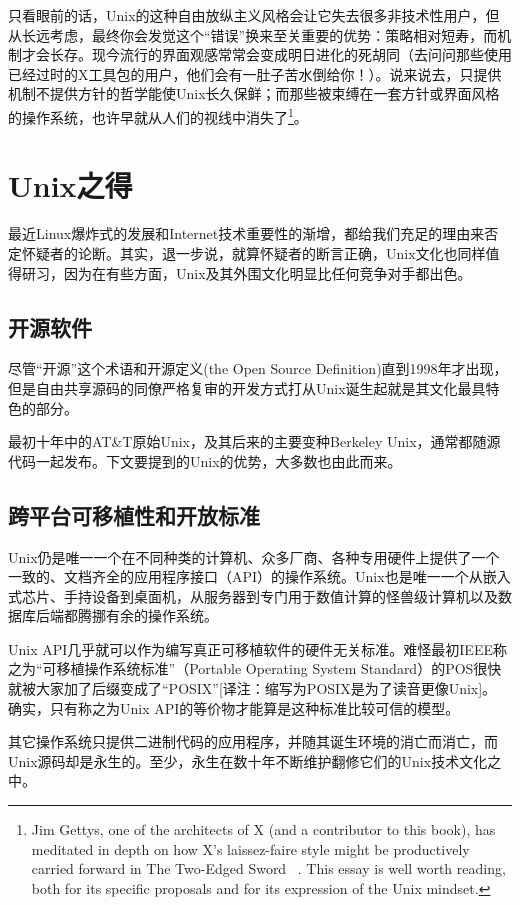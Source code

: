 \documentclass[12pt,oneside]{ctexbook}
\begin{document}
\begin{common-format}
只看眼前的话，Unix的这种自由放纵主义风格会让它失去很多非技术性用户，但从长远考虑，最终你会发觉这个“错误”换来至关重要的优势：策略相对短寿，而机制才会长存。现今流行的界面观感常常会变成明日进化的死胡同（去问问那些使用已经过时的X工具包的用户，他们会有一肚子苦水倒给你！）。说来说去，只提供机制不提供方针的哲学能使Unix长久保鲜；而那些被束缚在一套方针或界面风格的操作系统，也许早就从人们的视线中消失了\footnote{Jim Gettys, one of the architects of X (and a contributor to this book), has meditated in depth on how X's laissez-faire style might be productively carried forward in The Two-Edged Sword ~\cite{Gettys}. This essay is well worth reading, both for its specific proposals and for its expression of the Unix mindset.}。


\section{Unix之得}
最近Linux爆炸式的发展和Internet技术重要性的渐增，都给我们充足的理由来否定怀疑者的论断。其实，退一步说，就算怀疑者的断言正确，Unix文化也同样值得研习，因为在有些方面，Unix及其外围文化明显比任何竞争对手都出色。

\subsection{开源软件}
尽管“开源”这个术语和开源定义(the Open Source Definition)直到1998年才出现，但是自由共享源码的同僚严格复审的开发方式打从Unix诞生起就是其文化最具特色的部分。

最初十年中的AT\&{}T原始Unix，及其后来的主要变种Berkeley Unix，通常都随源代码一起发布。下文要提到的Unix的优势，大多数也由此而来。

\subsection{跨平台可移植性和开放标准}
Unix仍是唯一一个在不同种类的计算机、众多厂商、各种专用硬件上提供了一个一致的、文档齐全的应用程序接口（API）的操作系统。Unix也是唯一一个从嵌入式芯片、手持设备到桌面机，从服务器到专门用于数值计算的怪兽级计算机以及数据库后端都腾挪有余的操作系统。

Unix API几乎就可以作为编写真正可移植软件的硬件无关标准。难怪最初IEEE称之为“可移植操作系统标准”（Portable Operating System Standard）的POS很快就被大家加了后缀变成了“POSIX”[译注：缩写为POSIX是为了读音更像Unix]。  确实，只有称之为Unix API的等价物才能算是这种标准比较可信的模型。

其它操作系统只提供二进制代码的应用程序，并随其诞生环境的消亡而消亡，而Unix源码却是永生的。至少，永生在数十年不断维护翻修它们的Unix技术文化之中。


\end{common-format}
\end{document}
